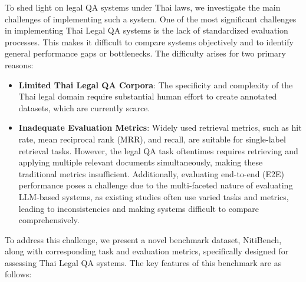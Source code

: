 
To shed light on legal QA systems under Thai laws, we investigate the main challenges of implementing such a system. 
%
One of the most significant challenges in implementing Thai Legal QA systems is the lack of standardized evaluation processes. 
%
This makes it difficult to compare systems objectively and to identify general performance gaps or bottlenecks. 
%
The difficulty arises for two primary reasons:  

\begin{itemize}
    \item \textbf{Limited Thai Legal QA Corpora}: The specificity and complexity of the Thai legal domain require substantial human effort to create annotated datasets, which are currently scarce.  
    
    \item \textbf{Inadequate Evaluation Metrics}: Widely used retrieval metrics, such as hit rate, mean reciprocal rank (MRR), and recall, are suitable for single-label retrieval tasks. 
    However, the legal QA task oftentimes requires retrieving and applying multiple relevant documents simultaneously, making these traditional metrics insufficient. 
    Additionally, evaluating end-to-end (E2E) performance poses a challenge due to the multi-faceted nature of evaluating LLM-based systems, as existing studies often use varied tasks and metrics, leading to inconsistencies and making systems difficult to compare comprehensively.
\end{itemize}

To address this challenge, we present a novel benchmark dataset, NitiBench, along with corresponding task and evaluation metrics, specifically designed for assessing Thai Legal QA systems. 
%
The key features of this benchmark are as follows:  

